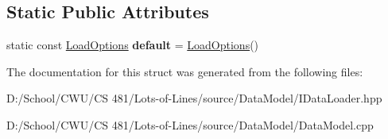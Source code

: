 \subsection*{Static Public Attributes}
\begin{DoxyCompactItemize}
\item 
static const \hyperlink{struct_lots_of_lines_1_1_load_options}{Load\+Options} {\bfseries default} = \hyperlink{struct_lots_of_lines_1_1_load_options}{Load\+Options}()\hypertarget{struct_lots_of_lines_1_1_load_options_a878a43e8132a04c11063b69383ea024b}{}\label{struct_lots_of_lines_1_1_load_options_a878a43e8132a04c11063b69383ea024b}

\end{DoxyCompactItemize}


The documentation for this struct was generated from the following files\+:\begin{DoxyCompactItemize}
\item 
D\+:/\+School/\+C\+W\+U/\+C\+S 481/\+Lots-\/of-\/\+Lines/source/\+Data\+Model/I\+Data\+Loader.\+hpp\item 
D\+:/\+School/\+C\+W\+U/\+C\+S 481/\+Lots-\/of-\/\+Lines/source/\+Data\+Model/Data\+Model.\+cpp\end{DoxyCompactItemize}
